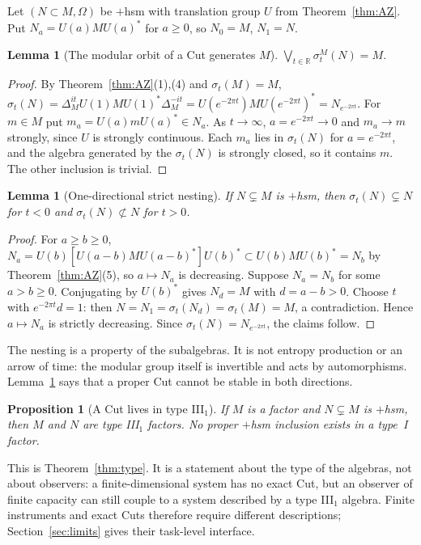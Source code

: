 \documentclass[12pt]{article}
\newtheorem{proposition}[theorem]{Proposition}
\newtheorem{lemma}[theorem]{Lemma}
\theoremstyle{definition}
\theoremstyle{remark}
\begin{document}
Let \((N\subset M,\Omega)\) be \(+\)hsm with translation group \(U\) from
Theorem~\ref{thm:AZ}. Put \(N_a=U(a)MU(a)^*\) for \(a\ge0\), so \(N_0=M\), \(N_1=N\).

\begin{lemma}[The modular orbit of a Cut generates \(M\)]\label{lem:orbit}
\(\bigvee_{t\in\mathbb R}\sigma^M_t(N)=M\).
\end{lemma}
\begin{proof}
By Theorem~\ref{thm:AZ}(1),(4) and \(\sigma_t(M)=M\),
\(\sigma_t(N)=\Delta_M^{it}U(1)MU(1)^*\Delta_M^{-it}=U(e^{-2\pi t})MU(e^{-2\pi t})^*
=N_{e^{-2\pi t}}\). For \(m\in M\) put \(m_a=U(a)mU(a)^*\in N_a\). As
\(t\to\infty\), \(a=e^{-2\pi t}\to0\) and \(m_a\to m\) strongly, since \(U\) is
strongly continuous. Each \(m_a\) lies in \(\sigma_t(N)\) for \(a=e^{-2\pi t}\), and
the algebra generated by the \(\sigma_t(N)\) is strongly closed, so it contains
\(m\). The other inclusion is trivial.
\end{proof}

\begin{lemma}[One-directional strict nesting]\label{lem:nest}
If \(N\subsetneq M\) is \(+\)hsm, then \(\sigma_t(N)\subsetneq N\) for \(t<0\) and
\(\sigma_t(N)\not\subset N\) for \(t>0\).
\end{lemma}
\begin{proof}
For \(a\ge b\ge0\), \(N_a=U(b)[U(a-b)MU(a-b)^*]U(b)^*\subset U(b)MU(b)^*=N_b\) by
Theorem~\ref{thm:AZ}(5), so \(a\mapsto N_a\) is decreasing. Suppose \(N_a=N_b\) for
some \(a>b\ge0\). Conjugating by \(U(b)^*\) gives \(N_d=M\) with \(d=a-b>0\). Choose
\(t\) with \(e^{-2\pi t}d=1\): then \(N=N_1=\sigma_t(N_d)=\sigma_t(M)=M\), a
contradiction. Hence \(a\mapsto N_a\) is strictly decreasing. Since
\(\sigma_t(N)=N_{e^{-2\pi t}}\), the claims follow.
\end{proof}

The nesting is a property of the subalgebras. It is not entropy production or an arrow
of time: the modular group itself is invertible and acts by automorphisms.
Lemma~\ref{lem:nest} says that a proper Cut cannot be stable in both directions.

\begin{proposition}[A Cut lives in type III\(_1\)]\label{prop:typeIII}
If \(M\) is a factor and \(N\subsetneq M\) is \(+\)hsm, then \(M\) and \(N\) are
type III\(_1\) factors. No proper \(+\)hsm inclusion exists in a type~I factor.
\end{proposition}
This is Theorem~\ref{thm:type}. It is a statement about the type of the algebras,
not about observers: a finite-dimensional system has no exact Cut, but an observer
of finite capacity can still couple to a system described by a type III\(_1\)
algebra. Finite instruments and exact Cuts therefore require different
descriptions; Section~\ref{sec:limits} gives their task-level interface.
\end{document}
